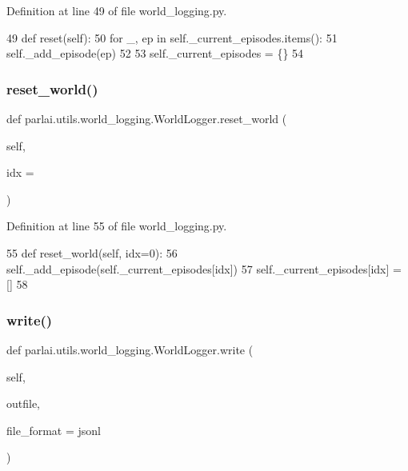 Definition at line 49 of file world\+\_\+logging.\+py.


\begin{DoxyCode}
49     \textcolor{keyword}{def }reset(self):
50         \textcolor{keywordflow}{for} \_, ep \textcolor{keywordflow}{in} self.\_current\_episodes.items():
51             self.\_add\_episode(ep)
52 
53         self.\_current\_episodes = \{\}
54 
\end{DoxyCode}
\mbox{\label{classparlai_1_1utils_1_1world__logging_1_1WorldLogger_a1f3d6928454f5d230891388bb661681a}} 
\subsubsection{\texorpdfstring{reset\+\_\+world()}{reset\_world()}}
{\footnotesize\ttfamily def parlai.\+utils.\+world\+\_\+logging.\+World\+Logger.\+reset\+\_\+world (\begin{DoxyParamCaption}\item[{}]{self,  }\item[{}]{idx = {} }\end{DoxyParamCaption})}



Definition at line 55 of file world\+\_\+logging.\+py.


\begin{DoxyCode}
55     \textcolor{keyword}{def }reset\_world(self, idx=0):
56         self.\_add\_episode(self.\_current\_episodes[idx])
57         self.\_current\_episodes[idx] = []
58 
\end{DoxyCode}
\mbox{\label{classparlai_1_1utils_1_1world__logging_1_1WorldLogger_a313438d1ccd5eef2b291dd0ee6dea59f}} 
\subsubsection{\texorpdfstring{write()}{write()}}
{\footnotesize\ttfamily def parlai.\+utils.\+world\+\_\+logging.\+World\+Logger.\+write (\begin{DoxyParamCaption}\item[{}]{self,  }\item[{}]{outfile,  }\item[{}]{file\+\_\+format = {\ttfamily \textquotesingle{}jsonl\textquotesingle{}} }\end{DoxyParamCaption})}



